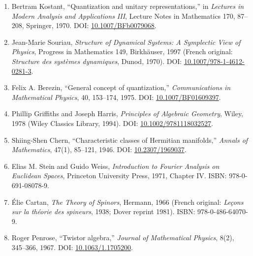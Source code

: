 \documentclass[
  a4paper,
]{article}
\providecommand{\tightlist}{%
  \setlength{\itemsep}{0pt}\setlength{\parskip}{0pt}}
\begin{document}
\begin{enumerate}
\def\labelenumi{\arabic{enumi}.}
\tightlist
\item
  Bertram Kostant, ``Quantization and unitary representations,'' in
  \emph{Lectures in Modern Analysis and Applications III}, Lecture Notes
  in Mathematics 170, 87--208, Springer, 1970. DOI:
  \href{https://doi.org/10.1007/BFb0079068}{10.1007/BFb0079068}.
\item
  Jean-Marie Souriau, \emph{Structure of Dynamical Systems: A Symplectic
  View of Physics}, Progress in Mathematics 149, Birkhäuser, 1997
  (French original: \emph{Structure des systèmes dynamiques}, Dunod,
  1970). DOI:
  \href{https://doi.org/10.1007/978-1-4612-0281-3}{10.1007/978-1-4612-0281-3}.
\item
  Felix A. Berezin, ``General concept of quantization,''
  \emph{Communications in Mathematical Physics}, 40, 153--174, 1975.
  DOI: \href{https://doi.org/10.1007/BF01609397}{10.1007/BF01609397}.
\item
  Phillip Griffiths and Joseph Harris, \emph{Principles of Algebraic
  Geometry}, Wiley, 1978 (Wiley Classics Library, 1994). DOI:
  \href{https://doi.org/10.1002/9781118032527}{10.1002/9781118032527}.
\item
  Shiing-Shen Chern, ``Characteristic classes of Hermitian manifolds,''
  \emph{Annals of Mathematics}, 47(1), 85--121, 1946. DOI:
  \href{https://doi.org/10.2307/1969037}{10.2307/1969037}.
\item
  Elias M. Stein and Guido Weiss, \emph{Introduction to Fourier Analysis
  on Euclidean Spaces}, Princeton University Press, 1971, Chapter IV.
  ISBN: 978-0-691-08078-9.
\item
  Élie Cartan, \emph{The Theory of Spinors}, Hermann, 1966 (French
  original: \emph{Leçons sur la théorie des spineurs}, 1938; Dover
  reprint 1981). ISBN: 978-0-486-64070-9.
\item
  Roger Penrose, ``Twistor algebra,'' \emph{Journal of Mathematical
  Physics}, 8(2), 345--366, 1967. DOI:
  \href{https://doi.org/10.1063/1.1705200}{10.1063/1.1705200}.
\end{enumerate}
\end{document}
